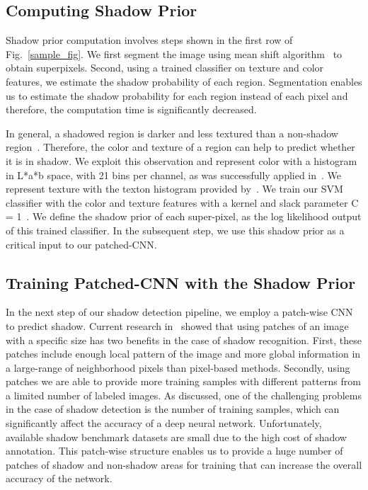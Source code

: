 \documentclass[letterpaper, 10 pt, conference]{ieeeconf}
\begin{document}
\subsection{Computing Shadow Prior}
\label{sh_prior}
Shadow prior computation involves steps shown in the first row of Fig.~\ref{sample_fig}. We first segment the image using mean shift algorithm~\cite{mean_shift} to obtain superpixels. Second, using a trained classifier on texture and color features, we estimate the shadow probability of each region. Segmentation enables us to estimate the shadow probability for each region instead of each pixel and therefore, the computation time is significantly decreased.

In general, a shadowed region is darker and less textured than a non-shadow region~\cite{Zhu}. Therefore, the color and texture of a region can help to predict whether it is in shadow. We exploit this observation and represent color with a histogram in L*a*b space, with 21 bins per channel, as was successfully applied in~\cite{Gue}. We represent texture with the texton histogram provided by~\cite{Martin}. We train our SVM classifier with the color and texture features with a  kernel and slack parameter C = 1~\cite{libsvm}. We define the shadow prior of each super-pixel, as the log likelihood output of this trained classifier. In the subsequent step, we use this shadow prior as a critical input to our patched-CNN. 

\subsection{Training Patched-CNN with the Shadow Prior}
\label{patched_cnn}
In the next step of our shadow detection pipeline, we employ a patch-wise CNN to predict shadow. Current research in~\cite{Vicente2} showed that using patches of an image with a specific size has two benefits in the case of shadow recognition. First, these patches include enough local pattern of the image and more global information in a large-range of neighborhood pixels than pixel-based methods. Secondly, using patches we are able to provide more training samples with different patterns from a limited number of labeled images. As discussed, one of the challenging problems in the case of shadow detection is the number of training samples, which can significantly affect the accuracy of a deep neural network. Unfortunately, available shadow benchmark datasets are small due to the high cost of shadow annotation. This patch-wise structure enables us to provide a huge number of patches of shadow and non-shadow areas for training that can increase the overall accuracy of the network.
\end{document}
